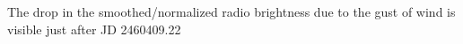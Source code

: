 The drop in the smoothed/normalized radio brightness due to the gust of wind is visible just after JD 2460409.22
